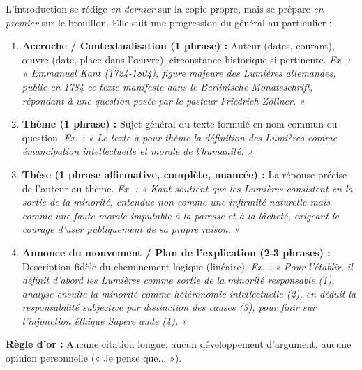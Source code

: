 \documentclass[11pt]{article}
\begin{document}
\begin{methode}
    L'introduction se rédige \emph{en dernier} sur la copie propre, mais se prépare \emph{en premier} sur le brouillon. Elle suit une progression du général au particulier :
    \begin{enumerate}
        \item \textbf{Accroche / Contextualisation (1 phrase) :} Auteur (dates, courant), œuvre (date, place dans l'œuvre), circonstance historique si pertinente. \emph{Ex. : « Emmanuel Kant (1724-1804), figure majeure des Lumières allemandes, publie en 1784 ce texte manifeste dans le \emph{Berlinische Monatsschrift}, répondant à une question posée par le pasteur Friedrich Zöllner. »}
        \item \textbf{Thème (1 phrase) :} Sujet général du texte formulé en nom commun ou question. \emph{Ex. : « Le texte a pour thème la définition des Lumières comme émancipation intellectuelle et morale de l'humanité. »}
        \item \textbf{Thèse (1 phrase affirmative, complète, nuancée) :} La réponse précise de l'auteur au thème. \emph{Ex. : « Kant soutient que les Lumières consistent en la sortie de la minorité, entendue non comme une infirmité naturelle mais comme une faute morale imputable à la paresse et à la lâcheté, exigeant le courage d'user publiquement de sa propre raison. »}
        \item \textbf{Annonce du mouvement / Plan de l'explication (2-3 phrases) :} Description fidèle du cheminement logique (linéaire). \emph{Ex. : « Pour l'établir, il définit d'abord les Lumières comme sortie de la minorité responsable (1), analyse ensuite la minorité comme hétéronomie intellectuelle (2), en déduit la responsabilité subjective par distinction des causes (3), pour finir sur l'injonction éthique \guillemotleft Sapere aude \guillemotright (4). »}
    \end{enumerate}
    \textbf{Règle d'or :} Aucune citation longue, aucun développement d'argument, aucune opinion personnelle (« Je pense que... »).
\end{methode}
\end{document}
